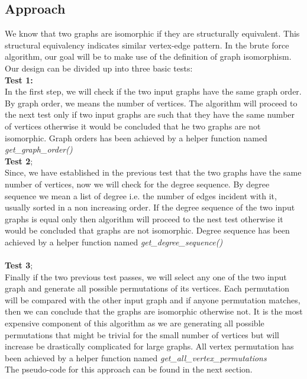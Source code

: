 \documentclass[11pt]{article}
\begin{document}
\subsection{Approach}
We know that two graphs are isomorphic if they are structurally equivalent. This structural equivalency indicates similar vertex-edge pattern. In the brute force algorithm, our goal will be to make use of the definition of graph isomorphism. Our design can be divided up into three basic tests:\\
\textbf{Test 1:}\\
In the first step, we will check if the two input graphs have the same graph order. By graph order, we means the number of vertices. The algorithm will proceed to the next test only if two input graphs are such that they have the same number of vertices otherwise it would be concluded that he two graphs are not isomorphic. Graph orders has been achieved by a helper function named \textit{get\_graph\_order()} \\
\textbf{Test 2};\\
Since, we have established in the previous test that the two graphs have the same number of vertices, now we will check for the degree sequence. By degree sequence we mean a list of degree i.e. the number of edges incident with it, usually sorted in a non increasing order. If the degree sequence of the two input graphs is equal only then algorithm will proceed to the nest test otherwise it would be concluded that graphs are not isomorphic. Degree sequence has been achieved by a helper function named \textit{get\_degree\_sequence()} \\\\
\textbf{Test 3};\\
Finally if the two previous test passes, we will select any one of the two input graph and generate all possible permutations of its vertices. Each permutation will be compared with the other input graph and if anyone permutation matches, then we can conclude that the graphs are isomorphic otherwise not. It is the most expensive component of this algorithm as we are generating all possible permutations that might be trivial for the small number of vertices but will increase be drastically complicated for large graphs. All vertex permutation has been achieved by a helper function named \textit{get\_all\_vertex\_permutations} \\
The pseudo-code for this approach can be found in the next section. 
\label{sect:pdf}
\end{document}
